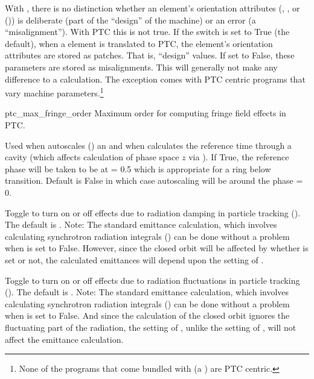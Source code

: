 {\begin{description}
With \bmad, there is no distinction whether an element's orientation attributes (,
, or  ()) is deliberate (part of the ``design'' of the machine)
or an error (a ``misalignment'').  With PTC this is not true. If the 
switch is set to True (the default), when a \bmad element is translated to PTC,
the element's orientation attributes are stored as patches. That is, ``design'' values.
If set to False, these parameters are stored as misalignments. This will generally not make any
difference to a calculation. The exception comes with PTC centric programs that vary machine
parameters.\footnote
  {
None of the programs that come bundled with \bmad (a \bmad {}) are
PTC centric.
  }
%
\item{ptc_max_fringe_order} \Newline
Maximum order for computing fringe field effects in PTC. 
%
\item[\vn{rf_phase_below_transition_ref}] \Newline
Used when \bmad autoscales () an  and when \bmad calculates the
reference time through a cavity (which affects calculation of phase space $z$ via ).  If
True, the reference phase will be taken to be at  = 0.5 which is appropriate for a ring
below transition. Default is False in which case autoscaling will be around the phase  = 0.
%
\item[\vn{radiation_damping_on}] \Newline
Toggle to turn on or off effects due to radiation damping in particle tracking
(). The default is . Note: The standard \bmad emittance calculation,
which involves calculating synchrotron radiation integrals () can be done without
a problem when  is set to False. However, since the closed orbit will be
affected by whether  is set or not, the calculated emittances will depend
upon the setting of .
%
\item[\vn{radiation_fluctuations_on}] \Newline
Toggle to turn on or off effects due to radiation fluctuations in particle tracking
().  The default is . Note: The standard \bmad emittance calculation,
which involves calculating synchrotron radiation integrals () can be done without
a problem when  is set to False. And since the calculation of the closed orbit
ignores the fluctuating part of the radiation, the setting of , unlike the
setting of , will not affect the emittance calculation.

\end{description}}
